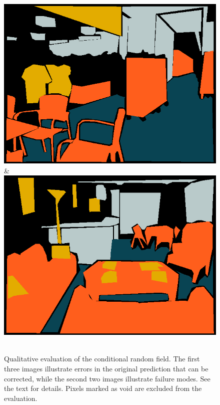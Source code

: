 \documentclass[a4paper, 10pt, conference]{ieeeconf}      %
\begin{document}
\begin{figure}
\begin{tabu}
    \includegraphics[width=\linewidth]{images/00118_gt.png}&%
    \includegraphics[width=\linewidth]{images/01203_gt.png}\\
    \\
    \end{tabu}
\caption{%
Qualitative evaluation of the conditional random field.
The first three images illustrate errors in the original prediction that can be corrected, while
the second two images illustrate failure modes. See the text for details. Pixels marked as void
are excluded from the evaluation.
}
\end{figure}
\end{document}
